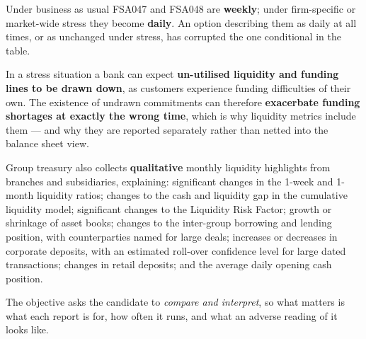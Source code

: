 \begin{lrtrapbox}
Under business as usual FSA047 and FSA048 are \textbf{weekly}; under firm-specific or market-wide stress they become \textbf{daily}. An option describing them as daily at all times, or as unchanged under stress, has corrupted the one conditional in the table.
\end{lrtrapbox}

\begin{lrkeybox}
In a stress situation a bank can expect \textbf{un-utilised liquidity and funding lines to be drawn down}, as customers experience funding difficulties of their own. The existence of undrawn commitments can therefore \textbf{exacerbate funding shortages at exactly the wrong time}, which is why liquidity metrics include them --- and why they are reported separately rather than netted into the balance sheet view.
\end{lrkeybox}

\begin{lrkeybox}
Group treasury also collects \textbf{qualitative} monthly liquidity highlights from branches and subsidiaries, explaining: significant changes in the 1-week and 1-month liquidity ratios; changes to the cash and liquidity gap in the cumulative liquidity model; significant changes to the Liquidity Risk Factor; growth or shrinkage of asset books; changes to the inter-group borrowing and lending position, with counterparties named for large deals; increases or decreases in corporate deposits, with an estimated roll-over confidence level for large dated transactions; changes in retail deposits; and the average daily opening cash position.
\end{lrkeybox}


\gapbadge
{}

\begin{lrgapbox}
The objective asks the candidate to \emph{compare and interpret}, so what matters is what each report is for, how often it runs, and what an adverse reading of it looks like.
\end{lrgapbox}

